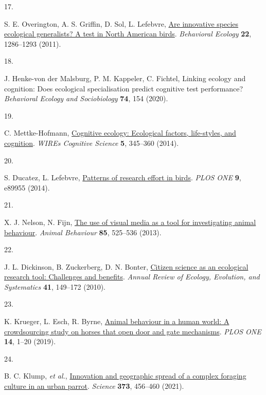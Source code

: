 \documentclass[
  man,floatsintext]{apa6}
\newlength{\cslhangindent}
\newlength{\csllabelwidth}
\newlength{\cslentryspacingunit} %
\newenvironment{CSLReferences}[2] %
 {%
  \setlength{\parindent}{0pt}
  \ifodd #1
  \let\oldpar\par
  \def\par{\hangindent=\cslhangindent\oldpar}
  \fi
  \setlength{\parskip}{#2\cslentryspacingunit}
 }%
 {}
\newcommand{\CSLLeftMargin}[1]{\parbox[t]{\csllabelwidth}{#1}}
\newcommand{\CSLRightInline}[1]{\parbox[t]{\linewidth - \csllabelwidth}{#1}\break}
\begin{document}
\begin{CSLReferences}{0}{0}
\leavevmode{}%
\CSLLeftMargin{17. }%
\CSLRightInline{S. E. Overington, A. S. Griffin, D. Sol, L. Lefebvre, \href{https://doi.org/10.1093/beheco/arr130}{Are innovative species ecological generalists? A test in {N}orth {A}merican birds}. \emph{Behavioral Ecology} \textbf{22}, 1286--1293 (2011).}

\leavevmode{}%
\CSLLeftMargin{18. }%
\CSLRightInline{J. Henke-von der Malsburg, P. M. Kappeler, C. Fichtel, Linking ecology and cognition: Does ecological specialisation predict cognitive test performance? \emph{Behavioral Ecology and Sociobiology} \textbf{74}, 154 (2020).}

\leavevmode{}%
\CSLLeftMargin{19. }%
\CSLRightInline{C. Mettke-Hofmann, \href{https://doi.org/10.1002/wcs.1289}{Cognitive ecology: Ecological factors, life-styles, and cognition}. \emph{WIREs Cognitive Science} \textbf{5}, 345--360 (2014).}

\leavevmode{}%
\CSLLeftMargin{20. }%
\CSLRightInline{S. Ducatez, L. Lefebvre, \href{https://doi.org/10.1371/journal.pone.0089955}{Patterns of research effort in birds}. \emph{PLOS ONE} \textbf{9}, e89955 (2014).}

\leavevmode{}%
\CSLLeftMargin{21. }%
\CSLRightInline{X. J. Nelson, N. Fijn, \href{https://doi.org/10.1016/j.anbehav.2012.12.009}{The use of visual media as a tool for investigating animal behaviour}. \emph{Animal Behaviour} \textbf{85}, 525--536 (2013).}

\leavevmode{}%
\CSLLeftMargin{22. }%
\CSLRightInline{J. L. Dickinson, B. Zuckerberg, D. N. Bonter, \href{https://doi.org/10.1146/annurev-ecolsys-102209-144636}{Citizen science as an ecological research tool: Challenges and benefits}. \emph{Annual Review of Ecology, Evolution, and Systematics} \textbf{41}, 149--172 (2010).}

\leavevmode{}%
\CSLLeftMargin{23. }%
\CSLRightInline{K. Krueger, L. Esch, R. Byrne, \href{https://doi.org/10.1371/journal.pone.0218954}{Animal behaviour in a human world: A crowdsourcing study on horses that open door and gate mechanisms}. \emph{PLOS ONE} \textbf{14}, 1--20 (2019).}

\leavevmode{}%
\CSLLeftMargin{24. }%
\CSLRightInline{B. C. Klump, \emph{et al.}, \href{https://doi.org/10.1126/science.abe7808}{Innovation and geographic spread of a complex foraging culture in an urban parrot}. \emph{Science} \textbf{373}, 456--460 (2021).}


\end{CSLReferences}
\end{document}
